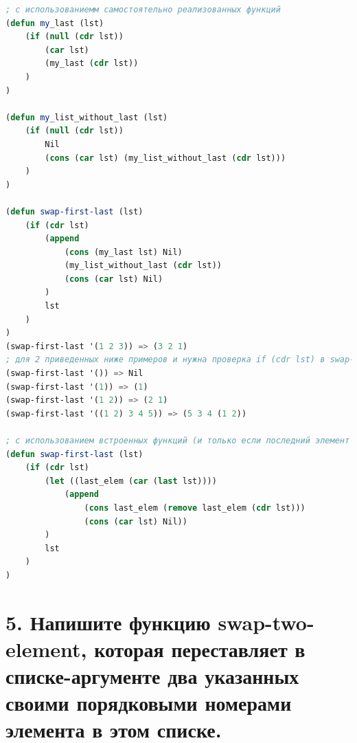 \documentclass[12pt]{report}
\begin{document}
\begin{lstlisting}[language=Lisp]
; с использованиемм самостоятельно реализованных функций
(defun my_last (lst) 
	(if (null (cdr lst))
		(car lst)
		(my_last (cdr lst))
	)
)
	
(defun my_list_without_last (lst)
	(if (null (cdr lst))
		Nil
		(cons (car lst) (my_list_without_last (cdr lst)))
	)
)

(defun swap-first-last (lst)
	(if (cdr lst)
		(append 
			(cons (my_last lst) Nil)
			(my_list_without_last (cdr lst)) 
			(cons (car lst) Nil)	
		)
		lst
	)
)
(swap-first-last '(1 2 3)) => (3 2 1)
; для 2 приведенных ниже примеров и нужна проверка if (cdr lst) в swap-first-last
(swap-first-last '()) => Nil
(swap-first-last '(1)) => (1)
(swap-first-last '(1 2)) => (2 1)
(swap-first-last '((1 2) 3 4 5)) => (5 3 4 (1 2))

; с использованием встроенных функций (и только если последний элемент -- атом)
(defun swap-first-last (lst)
	(if (cdr lst)
		(let ((last_elem (car (last lst))))
			(append 
				(cons last_elem (remove last_elem (cdr lst))) 
				(cons (car lst) Nil))
		)
		lst
	)
)
\end{lstlisting}

\section*{5. Напишите функцию swap-two-element, которая переставляет в списке-аргументе два указанных своими порядковыми номерами элемента в этом списке.}
\end{document}
